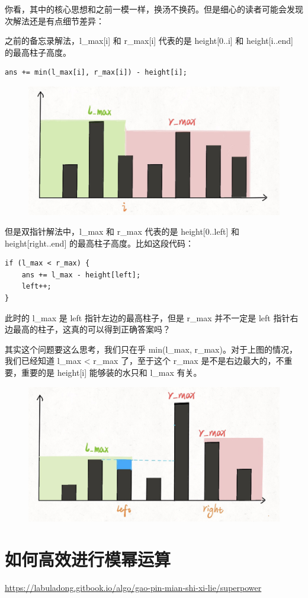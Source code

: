 \documentclass[12pt]{article}
\begin{document}
你看，其中的核心思想和之前一模一样，换汤不换药。但是细心的读者可能会发现次解法还是有点细节差异：

之前的备忘录解法，l\_max[i] 和 r\_max[i] 代表的是 height[0..i] 和 height[i..end] 的最高柱子高度。

\begin{lstlisting}
ans += min(l_max[i], r_max[i]) - height[i];
\end{lstlisting}
\begin{figure}[H]
    \centering
    \includegraphics[width=.6\textwidth]{fig/Receive_Rainwater_5.png}
\end{figure}

但是双指针解法中，l\_max 和 r\_max 代表的是 height[0..left] 和 height[right..end] 的最高柱子高度。比如这段代码：
\begin{lstlisting}
if (l_max < r_max) {
    ans += l_max - height[left];
    left++; 
} 
\end{lstlisting}

此时的 l\_max 是 left 指针左边的最高柱子，但是 r\_max 并不一定是 left 指针右边最高的柱子，这真的可以得到正确答案吗？

其实这个问题要这么思考，我们只在乎 min(l\_max, r\_max)。对于上图的情况，我们已经知道 l\_max < r\_max 了，至于这个 r\_max 是不是右边最大的，不重要，重要的是 height[i] 能够装的水只和 l\_max 有关。
\begin{figure}[H]
    \centering
    \includegraphics[width=.6\textwidth]{fig/Receive_Rainwater_6.png}
\end{figure}

\section{如何高效进行模幂运算}
\url{https://labuladong.gitbook.io/algo/gao-pin-mian-shi-xi-lie/superpower}
\end{document}
